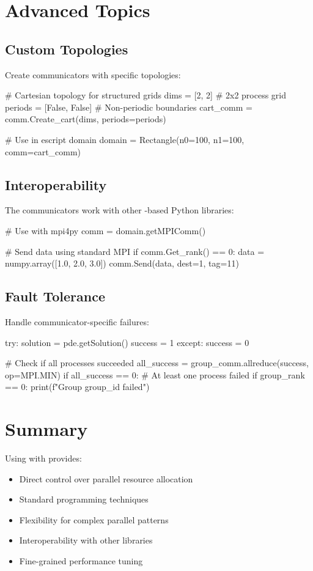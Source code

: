 \section{Advanced Topics}

\subsection{Custom Topologies}

Create communicators with specific topologies:
\begin{python}
# Cartesian topology for structured grids
dims = [2, 2]  # 2x2 process grid
periods = [False, False]  # Non-periodic boundaries
cart_comm = comm.Create_cart(dims, periods=periods)

# Use in escript domain
domain = Rectangle(n0=100, n1=100, comm=cart_comm)
\end{python}

\subsection{Interoperability}

The communicators work with other \MPI-based Python libraries:
\begin{python}
# Use with mpi4py
comm = domain.getMPIComm()

# Send data using standard MPI
if comm.Get_rank() == 0:
    data = numpy.array([1.0, 2.0, 3.0])
    comm.Send(data, dest=1, tag=11)
\end{python}

\subsection{Fault Tolerance}

Handle communicator-specific failures:
\begin{python}
try:
    solution = pde.getSolution()
    success = 1
except:
    success = 0

# Check if all processes succeeded
all_success = group_comm.allreduce(success, op=MPI.MIN)
if all_success == 0:
    # At least one process failed
    if group_rank == 0:
        print(f"Group {group_id} failed")
\end{python}

\section{Summary}

Using \mpifo with \escript provides:
\begin{itemize}
\item Direct control over parallel resource allocation
\item Standard \MPI programming techniques
\item Flexibility for complex parallel patterns
\item Interoperability with other \MPI libraries
\item Fine-grained performance tuning
\end{itemize}

